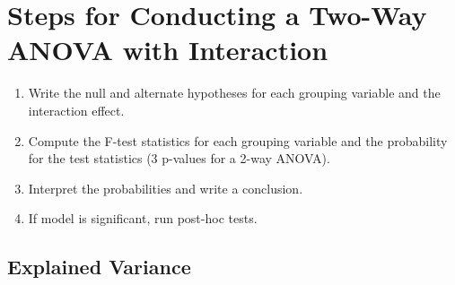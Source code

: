 \documentclass[
  letterpaper,
  DIV=11,
  numbers=noendperiod]{scrreprt}
\providecommand{\tightlist}{%
  \setlength{\itemsep}{0pt}\setlength{\parskip}{0pt}}\usepackage{longtable,booktabs,array}
\begin{document}
\section{Steps for Conducting a Two-Way ANOVA with
Interaction}\label{steps-for-conducting-a-two-way-anova-with-interaction}

\begin{enumerate}
\def\labelenumi{\arabic{enumi}.}
\tightlist
\item
  Write the null and alternate hypotheses for each grouping variable and
  the interaction effect.
\item
  Compute the F-test statistics for each grouping variable and the
  probability for the test statistics (3 p-values for a 2-way ANOVA).
\item
  Interpret the probabilities and write a conclusion.
\item
  If model is significant, run post-hoc tests.
\end{enumerate}

\subsection{Explained Variance}\label{explained-variance-2}
\end{document}
